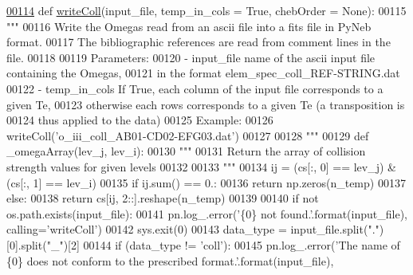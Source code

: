\begin{DoxyCode}
\hypertarget{namespacepyneb_1_1utils_1_1fits_l00114}{}\hyperlink{namespacepyneb_1_1utils_1_1fits_a468ecdfaa21de61a1037128ee889fd76}{00114} \textcolor{keyword}{def }\hyperlink{namespacepyneb_1_1utils_1_1fits_a468ecdfaa21de61a1037128ee889fd76}{writeColl}(input\_file, temp\_in\_cols = True, chebOrder = None):
00115     \textcolor{stringliteral}{""" }
00116 \textcolor{stringliteral}{    Write the Omegas read from an ascii file into a fits file in PyNeb format.}
00117 \textcolor{stringliteral}{    The bibliographic references are read from comment lines in the file.}
00118 \textcolor{stringliteral}{        }
00119 \textcolor{stringliteral}{    Parameters:}
00120 \textcolor{stringliteral}{        - input\_file    name of the ascii input file containing the Omegas,}
00121 \textcolor{stringliteral}{                        in the format elem\_spec\_coll\_REF-STRING.dat}
00122 \textcolor{stringliteral}{        - temp\_in\_cols  If True, each column of the input file corresponds to a given Te, }
00123 \textcolor{stringliteral}{                         otherwise each rows corresponds to a given Te (a transposition is }
00124 \textcolor{stringliteral}{                         thus applied to the data)}
00125 \textcolor{stringliteral}{    Example: }
00126 \textcolor{stringliteral}{    writeColl('o\_iii\_coll\_AB01-CD02-EFG03.dat')}
00127 \textcolor{stringliteral}{}
00128 \textcolor{stringliteral}{    """}
00129     \textcolor{keyword}{def }\_omegaArray(lev\_j, lev\_i):
00130         \textcolor{stringliteral}{"""}
00131 \textcolor{stringliteral}{        Return the array of collision strength values for given levels}
00132 \textcolor{stringliteral}{ }
00133 \textcolor{stringliteral}{        """}       
00134         ij = (cs[:, 0] == lev\_j) & (cs[:, 1] == lev\_i)
00135         \textcolor{keywordflow}{if} ij.sum() == 0.:
00136             \textcolor{keywordflow}{return} np.zeros(n\_temp)
00137         \textcolor{keywordflow}{else}:
00138             \textcolor{keywordflow}{return} cs[ij, 2::].reshape(n\_temp)
00139 
00140     \textcolor{keywordflow}{if} \textcolor{keywordflow}{not} os.path.exists(input\_file):
00141         pn.log\_.error(\textcolor{stringliteral}{'\{0\} not found.'}.format(input\_file), calling=\textcolor{stringliteral}{'writeColl'})
00142         sys.exit(0)
00143     data\_type = input\_file.split(\textcolor{stringliteral}{"."})[0].split(\textcolor{stringliteral}{"\_"})[2]
00144     \textcolor{keywordflow}{if} (data\_type != \textcolor{stringliteral}{'coll'}):
00145         pn.log\_.error(\textcolor{stringliteral}{'The name of \{0\} does not conform to the prescribed format.'}.format(input\_file), 

\end{DoxyCode}

